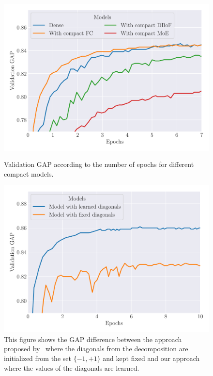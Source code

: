 \begin{figure}[H]
  \centering
  \includegraphics[width=\scalefigure\textwidth]{figures/appendix/ap2-training_video_classification/graph_compact_layers}
  \caption{Validation GAP according to the number of epochs for different compact models.}
  \label{figure:ap2-learning_curve_layers}
	\vspace{1cm}
  \includegraphics[width=\scalefigure\textwidth]{figures/appendix/ap2-training_video_classification/graph_comparison_learned_diagonal}
	\caption{This figure shows the GAP difference between the approach proposed by~\citet{cheng2015exploration} where the diagonals from the decomposition are initialized from the set $\{-1, +1\}$ and kept fixed and our approach where the values of the diagonals are learned.} 
  \label{figure:ap2-learning_dc_cd}
\end{figure}



